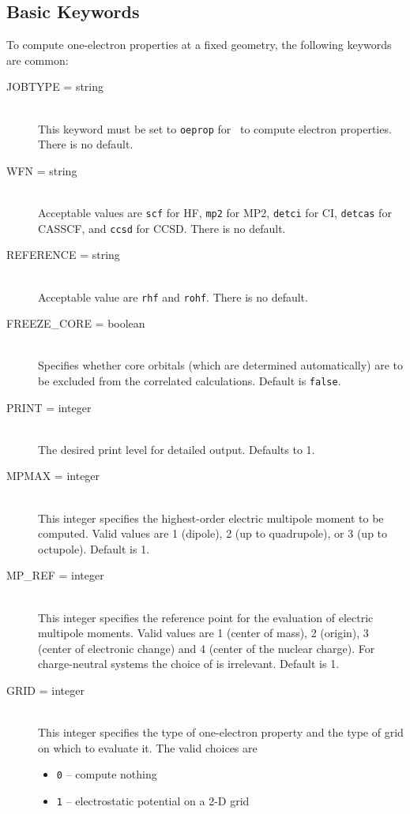 \subsection{Basic Keywords}

To compute one-electron properties at a fixed geometry,
the following keywords are common:
\begin{description}
\item[JOBTYPE = string]\mbox{}\\
This keyword must be set to {\tt oeprop} for \PSIthree\
to compute electron properties. There is no default.
\item[WFN = string]\mbox{}\\
Acceptable values are {\tt scf} for HF, {\tt mp2} for MP2,
{\tt detci} for CI, {\tt detcas} for CASSCF, and {\tt ccsd}
for CCSD. There is no default.
\item[REFERENCE = string]\mbox{}\\
Acceptable value are {\tt rhf} and {\tt rohf}. There is no default.
\item[FREEZE\_CORE = boolean]\mbox{}\\
Specifies whether core orbitals (which are determined automatically) are to
be excluded from the correlated calculations.  Default is {\tt false}.
\item[PRINT = integer]\mbox{}\\
The desired print level for detailed output. Defaults to 1.
\item[MPMAX = integer]\mbox{}\\
This integer specifies the highest-order electric multipole moment
to be computed. Valid values are 1 (dipole), 2 (up to quadrupole), or
3 (up to octupole). Default is 1.
\item[MP\_REF = integer]\mbox{}\\
This integer specifies the reference point for the evaluation of
electric multipole moments. Valid values are 1 (center of mass),
2 (origin), 3 (center of electronic change) and
4 (center of the nuclear charge). For charge-neutral systems the
choice of \keyword{MP\_REF} is irrelevant. Default is 1.
\item[GRID = integer]\mbox{}\\
This integer specifies the type of one-electron property and the
type of grid on which to evaluate it. The valid choices are
\begin{itemize}
\item {\tt 0} -- compute nothing
\item {\tt 1} -- electrostatic potential on a 2-D grid

\end{itemize}
\end{description}
